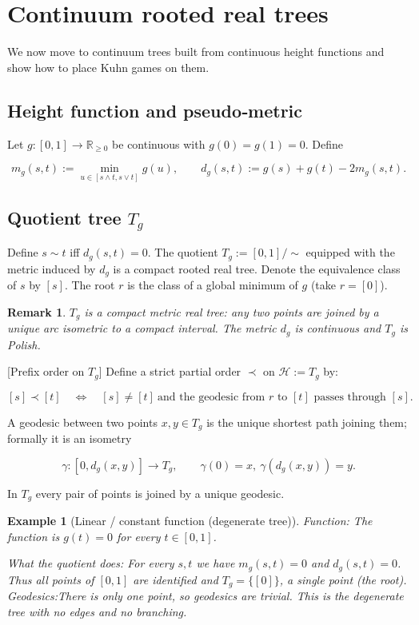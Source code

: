 \documentclass[11pt]{article}
\newtheorem{remark}[definition]{Remark}
\newtheorem{example}[definition]{Example}
\begin{document}
\section{Continuum rooted real trees}\label{sec:continuum_tree}
We now move to continuum trees built from continuous height functions and
show how to place Kuhn games on them.

\subsection{Height function and pseudo‑metric}
Let \(g:[0,1]\to\mathbb R_{\ge0}\) be continuous with \(g(0)=g(1)=0\).
Define


\[
m_g(s,t):=\min_{u\in[s\wedge t,s\vee t]} g(u),\qquad
d_g(s,t):=g(s)+g(t)-2m_g(s,t).
\]




\subsection{Quotient tree \(T_g\)}
Define \(s\sim t\) iff \(d_g(s,t)=0\). The quotient
\(T_g:=[0,1]/\!\sim\) equipped with the metric induced by \(d_g\) is a
compact rooted real tree. Denote the equivalence class of \(s\) by \([s]\).
The root \(r\) is the class of a global minimum of \(g\) (take \(r=[0]\)).

\begin{remark}
\(T_g\) is a compact metric real tree: any two points are joined by a
unique arc isometric to a compact interval. The metric \(d_g\) is
continuous and \(T_g\) is Polish.
\end{remark}


 [Prefix order on \(T_g\)]
Define a strict partial order \(\prec\) on \(\mathcal H:=T_g\) by:


\[
[s]\prec[t]\quad\Longleftrightarrow\quad [s]\neq[t]\ \text{and the geodesic from }r\text{ to }[t]\text{ passes through }[s].
\]





A geodesic between two points \(x,y\in T_g\) is the unique shortest path joining them; formally it is an isometry


\[
\gamma:[0,d_g(x,y)]\to T_g,\qquad \gamma(0)=x,\ \gamma(d_g(x,y))=y.
\]


In \(T_g\) every pair of points is joined by a unique geodesic.




\begin{example} [Linear / constant function (degenerate tree)]
Function: The function is \(g(t)=0\) for every \(t\in[0,1]\).

What the quotient does: For every \(s,t\) we have \(m_g(s,t)=0\) and \(d_g(s,t)=0\). Thus all points of \([0,1]\) are identified and \(T_g=\{[0]\}\), a single point (the root).
Geodesics:There is only one point, so geodesics are trivial. This is the degenerate tree with no edges and no branching.
\end{example}
\end{document}
